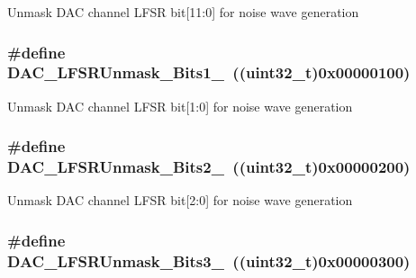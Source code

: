 Unmask DAC channel LFSR bit\mbox{[}11:0\mbox{]} for noise wave generation \hypertarget{group__DAC__lfsrunmask__triangleamplitude_ga09f47cfa563252a1add4662284350c07}{
\subsubsection[{DAC\_\-LFSRUnmask\_\-Bits1\_\-0}]{\setlength{\rightskip}{0pt plus 5cm}\#define DAC\_\-LFSRUnmask\_\-Bits1\_~((uint32\_\-t)0x00000100)}}
\label{group__DAC__lfsrunmask__triangleamplitude_ga09f47cfa563252a1add4662284350c07}
Unmask DAC channel LFSR bit\mbox{[}1:0\mbox{]} for noise wave generation \hypertarget{group__DAC__lfsrunmask__triangleamplitude_ga60b800857b7e33d9c0be2846fc56849f}{
\subsubsection[{DAC\_\-LFSRUnmask\_\-Bits2\_\-0}]{\setlength{\rightskip}{0pt plus 5cm}\#define DAC\_\-LFSRUnmask\_\-Bits2\_~((uint32\_\-t)0x00000200)}}
\label{group__DAC__lfsrunmask__triangleamplitude_ga60b800857b7e33d9c0be2846fc56849f}
Unmask DAC channel LFSR bit\mbox{[}2:0\mbox{]} for noise wave generation \hypertarget{group__DAC__lfsrunmask__triangleamplitude_gafe219362b3a48d8678a65ef38cb45532}{
\subsubsection[{DAC\_\-LFSRUnmask\_\-Bits3\_\-0}]{\setlength{\rightskip}{0pt plus 5cm}\#define DAC\_\-LFSRUnmask\_\-Bits3\_~((uint32\_\-t)0x00000300)}}
\label{group__DAC__lfsrunmask__triangleamplitude_gafe219362b3a48d8678a65ef38cb45532}
